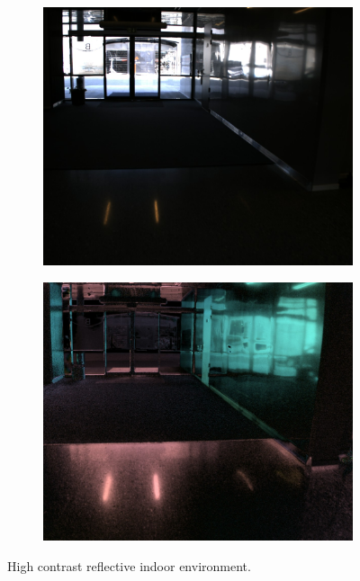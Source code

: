  \begin{figure}[H]
     \begin{subfigure}[T]{.49\textwidth}
         \includegraphics[width=\textwidth]{figures/pictures/img_9306_s0.jpg}
     \end{subfigure} \hfill
    \begin{subfigure}[T]{.49\textwidth}
         \includegraphics[width=\textwidth]{figures/pictures/img_9306_pol.jpg}
     \end{subfigure}
     \caption{High contrast reflective indoor environment.}
 \end{figure}
 \vspace{-.5cm}



